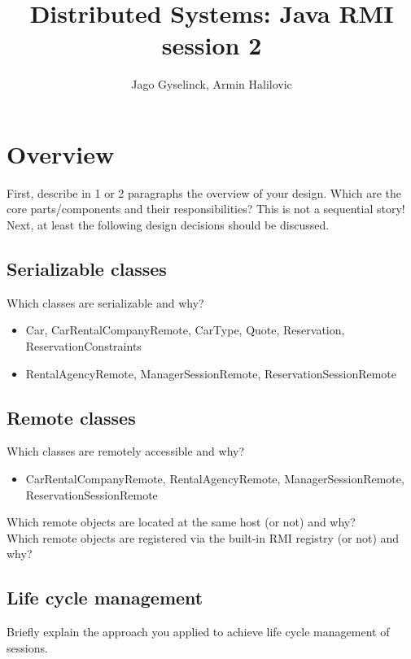 \documentclass{scrartcl}
\title{Distributed Systems: Java RMI session 2}
\author{Jago Gyselinck, Armin Halilovic}
\begin{document}
	\maketitle

	\section{Overview}
	First, describe in 1 or 2 paragraphs the overview of your design. Which are the core
    parts/components and their responsibilities? This is not a sequential story! Next, at least the
    following design decisions should be discussed. \\


    \subsection{Serializable classes}
    Which classes are serializable and why? \\
    \begin{itemize}
		\item Car, CarRentalCompanyRemote, CarType, Quote, Reservation, ReservationConstraints
		\item RentalAgencyRemote, ManagerSessionRemote, ReservationSessionRemote
	\end{itemize}


    \subsection{Remote classes}
    Which classes are remotely accessible and why?  \\
	\begin{itemize}
		\item CarRentalCompanyRemote, RentalAgencyRemote, ManagerSessionRemote, ReservationSessionRemote
	\end{itemize}
    Which remote objects are located at the same host (or not) and why? \\
    Which remote objects are registered via the built-in RMI registry (or not) and why? \\

    \subsection{Life cycle management}

    Briefly explain the approach you applied to achieve life cycle management of sessions. \\
\end{document}
